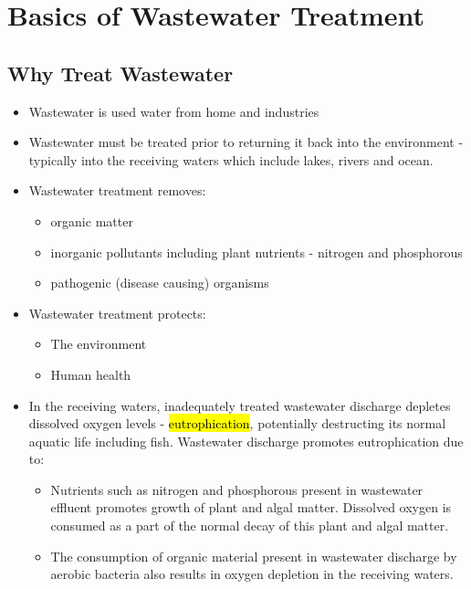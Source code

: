 
\chapter{Basics of Wastewater Treatment}

\section{Why Treat Wastewater}
\begin{itemize}
\item Wastewater is used water from home and industries\\
\item Wastewater must be treated prior to returning it back into the environment - typically into the receiving waters which include lakes, rivers and ocean.


\item Wastewater treatment removes:
\begin{itemize}
\item organic matter
\item inorganic  pollutants including plant nutrients - nitrogen and phosphorous\\
\item pathogenic (disease causing) organisms\\
\end{itemize}

\item Wastewater treatment protects:
\begin{itemize}
\item The environment
\item Human health
\end{itemize}

\item In the receiving waters, inadequately treated wastewater discharge depletes dissolved oxygen levels - \hl{eutrophication}, potentially destructing its normal aquatic life including fish.  Wastewater discharge promotes eutrophication due to:

\begin{itemize}
\item Nutrients such as nitrogen and phosphorous present in wastewater effluent promotes growth of plant and algal matter.  Dissolved oxygen is consumed as a part of the normal decay of this plant and algal matter.  
\item The consumption of organic material present in wastewater discharge by aerobic bacteria also results in oxygen depletion in the receiving waters.  


\end{itemize}
\end{itemize}

